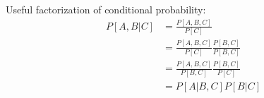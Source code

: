 \begin{appendices}
%
%
%
Useful factorization of conditional probability:
\begin{align}
P[A,B|C]&=\frac{P[A,B,C]}{P[C]} \\
&= \frac{P[A,B,C]}{P[C]} \frac{P[B,C]}{P[B,C]}\\
&= \frac{P[A,B,C]}{P[B,C]} \frac{P[B,C]}{P[C]}\\
&= P[A|B,C] P[B|C]
\end{align}



\end{appendices}
